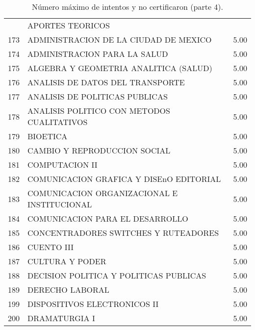 \documentclass[12pt]{article}
\begin{document}
\begin{table}[ht]
{\begin{tabular}{rlr}
   &  APORTES TEORICOS &  \\ 
  173 & ADMINISTRACION DE LA CIUDAD DE MEXICO & 5.00 \\ 
  174 & ADMINISTRACION PARA LA SALUD & 5.00 \\ 
  175 & ALGEBRA Y GEOMETRIA ANALITICA (SALUD) & 5.00 \\ 
  176 & ANALISIS DE DATOS DEL TRANSPORTE & 5.00 \\ 
  177 & ANALISIS DE POLITICAS PUBLICAS & 5.00 \\ 
  178 & ANALISIS POLITICO CON METODOS CUALITATIVOS & 5.00 \\ 
  179 & BIOETICA & 5.00 \\ 
  180 & CAMBIO Y REPRODUCCION SOCIAL & 5.00 \\ 
  181 & COMPUTACION II & 5.00 \\ 
  182 & COMUNICACION GRAFICA Y DISEnO EDITORIAL & 5.00 \\ 
  183 & COMUNICACION ORGANIZACIONAL E INSTITUCIONAL & 5.00 \\ 
  184 & COMUNICACION PARA EL DESARROLLO & 5.00 \\ 
  185 & CONCENTRADORES SWITCHES Y RUTEADORES & 5.00 \\ 
  186 & CUENTO III & 5.00 \\ 
  187 & CULTURA Y PODER & 5.00 \\ 
  188 & DECISION POLITICA Y POLITICAS PUBLICAS & 5.00 \\ 
  189 & DERECHO LABORAL & 5.00 \\ 
  199 & DISPOSITIVOS ELECTRONICOS II & 5.00 \\ 
  200 & DRAMATURGIA I & 5.00 \\ 

   \hline
\end{tabular}
}\caption{\label{Num_Max_Intentos_Nunca_Cert_4} N\'umero m\'aximo de intentos y no certificaron (parte 4).}

\end{table}
\end{document}
